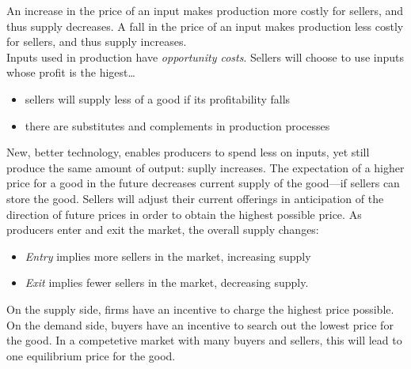 \documentclass{article}
\begin{document}
An increase in the price of an input makes production more costly for sellers, and thus supply decreases. A fall in the price of an input makes production less costly for sellers, and thus supply increases. \\ 

Inputs used in production have \emph{opportunity costs}. Sellers will choose to use inputs whose profit is the higest\dots 
\begin{itemize}
  \item sellers will supply less of a good if its profitability falls 
  \item there are substitutes and complements in production processes 
\end{itemize}

New, better technology, enables producers to spend less on inputs, yet still produce the same amount of output: suplly increases. The expectation of a higher price for a good in the future decreases current supply of the good---if sellers can store the good. Sellers will adjust their current offerings in anticipation of the direction of future prices in order to obtain the highest possible price. As producers enter and exit the market, the overall supply changes:
\begin{itemize}
  \item \emph{Entry} implies more sellers in the market, increasing supply
  \item \emph{Exit} implies fewer sellers in the market, decreasing supply. 
\end{itemize}

On the supply side, firms have an incentive to charge the highest price possible. On the demand side, buyers have an incentive to search out the lowest price for the good. In a competetive market with many buyers and sellers, this will lead to one equilibrium price for the good. 
\end{document}
